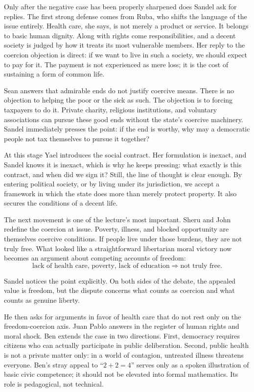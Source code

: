 Only after the negative case has been properly sharpened does Sandel ask for replies. The first strong defense comes from Ruba, who shifts the language of the issue entirely. Health care, she says, is not merely a product or service. It belongs to basic human dignity. Along with rights come responsibilities, and a decent society is judged by how it treats its most vulnerable members. Her reply to the coercion objection is direct: if we want to live in such a society, we should expect to pay for it. The payment is not experienced as mere loss; it is the cost of sustaining a form of common life.

Sean answers that admirable ends do not justify coercive means. There is no objection to helping the poor or the sick as such. The objection is to forcing taxpayers to do it. Private charity, religious institutions, and voluntary associations can pursue these good ends without the state's coercive machinery. Sandel immediately presses the point: if the end is worthy, why may a democratic people not tax themselves to pursue it together?

At this stage Yael introduces the social contract. Her formulation is inexact, and Sandel knows it is inexact, which is why he keeps pressing: what exactly is this contract, and when did we sign it? Still, the line of thought is clear enough. By entering political society, or by living under its jurisdiction, we accept a framework in which the state does more than merely protect property. It also secures the conditions of a decent life.

The next movement is one of the lecture's most important. Sheru and John redefine the coercion at issue. Poverty, illness, and blocked opportunity are themselves coercive conditions. If people live under those burdens, they are not truly free. What looked like a straightforward libertarian moral victory now becomes an argument about competing accounts of freedom:
\begin{equation}
\text{lack of health care, poverty, lack of education}
\Longrightarrow
\text{not truly free}.
\end{equation}

Sandel notices the point explicitly. On both sides of the debate, the appealed value is freedom, but the dispute concerns what counts as coercion and what counts as genuine liberty.

He then asks for arguments in favor of health care that do not rest only on the freedom-coercion axis. Juan Pablo answers in the register of human rights and moral shock. Ben extends the case in two directions. First, democracy requires citizens who can actually participate in public deliberation. Second, public health is not a private matter only: in a world of contagion, untreated illness threatens everyone. Ben's stray appeal to ``\(2+2=4\)'' serves only as a spoken illustration of basic civic competence; it should not be elevated into formal mathematics. Its role is pedagogical, not technical.


